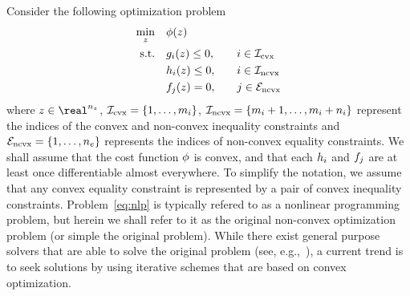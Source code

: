 \documentclass[letterpaper, 10 pt, conference]{ieeeconf}
\begin{document}
Consider the following optimization problem
\begin{subequations}\label{eq:nlp}
\begin{align}
\min_z &\quad \ocost(\z) &&\null \label{eq:nlp_a} \\
\text{s.t.} &\quad \fc_i(\z) \leq 0, &&\quad i \in \setIcvx \label{eq:nlp_b}\\
&\quad \fni_i (\z) \leq 0, &&\quad i \in \setIncvx \label{eq:nlp_c} \\
&\quad \fne_j(\z) = 0, &&\quad j \in \setEncvx \label{eq:nlp_d}
\end{align}
\end{subequations}
where $\z\in\real^{\nz}$, $\mathcal{I}_{\text{cvx}} = \{1,\ldots,m_i\}$, $\mathcal{I}_{\text{ncvx}}=\{m_i+1,\ldots,m_i+n_i\}$ represent the indices of the convex and non-convex inequality constraints and $\mathcal{E}_{\text{ncvx}}=\{1,\ldots,n_e\}$ represents the indices of non-convex equality constraints. We shall assume that the cost function $\phi$ is convex, and that each $h_i$ and $f_j$ are at least once differentiable almost everywhere. To simplify the notation, we assume that any convex equality constraint is represented by a pair of convex inequality constraints. Problem~\eqref{eq:nlp} is typically refered to as a nonlinear programming problem, but herein we shall refer to it as the original non-convex optimization problem (or simple the original problem). While there exist general purpose solvers that are able to solve the original problem (see, e.g.,~\cite{Gill1981,NocedalWright}), a current trend is to seek solutions by using iterative schemes that are based on convex optimization. 
\end{document}
